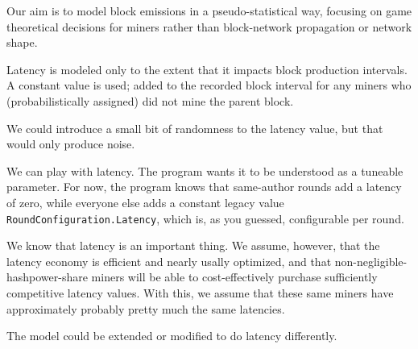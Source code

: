 \documentclass[11pt]{article}
\theoremstyle{plain}
\begin{document}
Our aim is to model block emissions in a pseudo-statistical way,
focusing on game theoretical decisions for miners rather than
block-network propagation or network shape.

Latency is modeled only to the extent that it impacts block production
intervals. A constant value is used; added to the recorded block interval
for any miners who (probabilistically assigned) did not mine the
parent block.

%
%

%

We could introduce a small bit of randomness to the latency value, but that
would only produce noise.

We can play with latency. The program wants it to be understood as a tuneable
parameter. For now, the program knows that same-author rounds add a latency of
zero, while everyone else adds a constant legacy value
\texttt{RoundConfiguration.Latency}, which is, as you guessed, configurable per 
round.

We know that latency is an important thing.
We assume, however, that the latency economy is efficient and nearly usally 
optimized,
and that non-negligible-hashpower-share miners will be able to cost-effectively
purchase sufficiently competitive latency values. With this, we assume that
these same miners have approximately probably pretty much the same latencies.

The model could be extended or modified to do latency differently.
\end{document}
